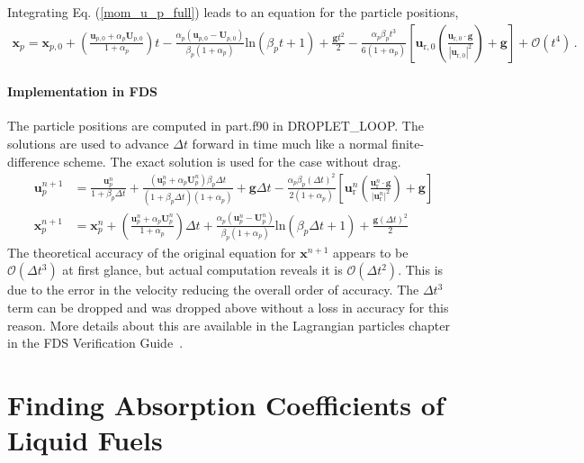 Integrating Eq. (\ref{mom_u_p_full}) leads to an equation for the particle positions,
\begin{align}
    \label{mom_x_p_full}
    \mathbf{x}_p = \mathbf{x}_{p,0} + \left(\frac{\mathbf{u}_{p,0} + \alpha_p \mathbf{U}_{p,0}}{1 + \alpha_p}\right) t - \frac{\alpha_p (\mathbf{u}_{p,0} - \mathbf{U}_{p,0})}{\beta_p (1 + \alpha_p)} \text{ln}(\beta_p t + 1) + \frac{\mathbf{g} t^2}{2} - \frac{\alpha_p \beta_p t^3}{6 (1 + \alpha_p)} \left[\mathbf{u}_{\text{r},0} \left(\frac{\mathbf{u}_{\text{r},0} \cdot \mathbf{g}}{|\mathbf{u}_{\text{r},0}|^2}\right) + \mathbf{g}\right] + \mathcal{O}(t^4) \,.
\end{align}

\subsubsection{Implementation in FDS}

The particle positions are computed in {\ct part.f90} in {\ct DROPLET\_LOOP}. The solutions are used to advance $\Delta t$ forward in time much like a normal finite-difference scheme. The exact solution is used for the case without drag.
\begin{align}
    \mathbf{u}_p^{n+1} &= \frac{\mathbf{u}_p^n}{1 + \beta_p \Delta t} + \frac{(\mathbf{u}_p^n + \alpha_p \mathbf{U}_p^n)\beta_p \Delta t}{(1 + \beta_p \Delta t)(1 + \alpha_p)} + \mathbf{g} \Delta t - \frac{\alpha_p \beta_p (\Delta t)^2}{2 (1 + \alpha_p)} \left[\mathbf{u}_\text{r}^n \left(\frac{\mathbf{u}_\text{r}^n \cdot \mathbf{g}}{|\mathbf{u}_\text{r}^n|^2}\right) + \mathbf{g}\right] \\[1cm]
    \mathbf{x}_p^{n+1} &= \mathbf{x}_p^n + \left(\frac{\mathbf{u}_p^n + \alpha_p \mathbf{U}_p^n}{1 + \alpha_p}\right) \Delta t + \frac{\alpha_p (\mathbf{u}_p^n - \mathbf{U}_p^n)}{\beta_p (1 + \alpha_p)} \text{ln}(\beta_p \Delta t + 1) + \frac{\mathbf{g} (\Delta t)^2}{2}
\end{align}
The theoretical accuracy of the original equation for $\mathbf{x}^{n+1}$ appears to be $\mathcal{O}(\Delta t^3)$ at first glance, but actual computation reveals it is $\mathcal{O}(\Delta t^2)$. This is due to the error in the velocity reducing the overall order of accuracy. The $\Delta t^3$ term can be dropped and was dropped above without a loss in accuracy for this reason. More details about this are available in the Lagrangian particles chapter in the FDS Verification Guide~\cite{FDS_Verification_Guide}.

\chapter{Finding Absorption Coefficients of Liquid Fuels}
\label{app_abscoeff}

